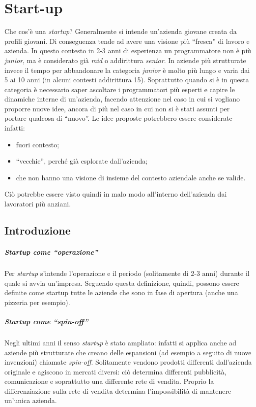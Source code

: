 \chapter{Start-up}

Che cos'è una \textit{startup}? Generalmente si intende un'azienda giovane
creata da profili giovani. Di conseguenza tende ad avere una visione più
``fresca'' di lavoro e azienda. In questo contesto in 2-3 anni di esperienza
un programmatore non è più \textit{junior}, ma è considerato già \textit{mid}
o addirittura \textit{senior}. In aziende più strutturate invece il tempo
per abbandonare la categoria \textit{junior} è molto più lungo e varia dai 5
ai 10 anni (in alcuni contesti addirittura 15). Soprattutto quando si è in
questa categoria è necessario saper ascoltare i programmatori più esperti e
capire le dinamiche interne di un'azienda, facendo attenzione nel caso in
cui si vogliano proporre nuove idee, ancora di più nel caso in cui non si è
stati assunti per portare qualcosa di ``nuovo''. Le idee proposte potrebbero
essere considerate infatti:
\begin{itemize}
  \item fuori contesto;
  \item ``vecchie'', perché già esplorate dall'azienda;
  \item che non hanno una visione di insieme del contesto aziendale anche se
  valide.
\end{itemize}
Ciò potrebbe essere visto quindi in malo modo all'interno dell'azienda dai
lavoratori più anziani.

\section{Introduzione}

\paragraph*{Startup come ``operazione''} Per \textit{startup} s'intende
l'operazione e il periodo (solitamente di 2-3 anni) durante il quale si avvia
un'impresa. Seguendo questa definizione, quindi, possono essere definite come
startup tutte le aziende che sono in fase di apertura (anche una pizzeria per
esempio).

\paragraph*{Startup come ``spin-off''}
Negli ultimi anni il senso \textit{startup} è stato ampliato: infatti si
applica anche ad aziende più strutturate che creano delle espansioni (ad
esempio a seguito di nuove invenzioni) chiamate \textit{spin-off}. Solitamente
vendono prodotti differenti dall'azienda originale e agiscono in mercati
diversi: ciò determina differenti pubblicità, comunicazione e soprattutto
una differente rete di vendita. Proprio la differenziazione sulla rete di
vendita determina l'impossibilità di mantenere un'unica azienda.

